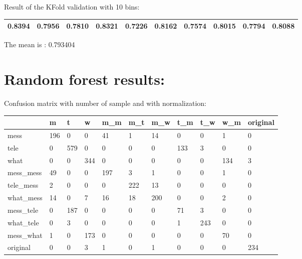 Result of the KFold validation with 10 bins:
 {\def\arraystretch{1.3} 
 \begin{table}[H] 
\centering 
\begin{tabular}{|l |l |l |l |l |l |l |l |l |l |}  
\hline 
0.8394&
0.7956&
0.7810&
0.8321&
0.7226&
0.8162&
0.7574&
0.8015&
0.7794&
0.8088\\ \hline  

\end{tabular} 
\end{table} }

The mean is : 0.793404\section{Random forest results:} 
Confusion matrix with number of sample and with normalization:
 {\def\arraystretch{1.3} 
 \begin{table}[H] 
\centering 
\begin{tabular}{|l|l|l|l|l|l|l|l|l|l|l|} 
\hline 
  &m  &t  &w  &m\_m  &m\_t  &m\_w  &t\_m  &t\_w  &w\_m  &original  \\ \hline
mess  &196  &0  &0  &41  &1  &14  &0  &0  &1  &0  \\ \hline
tele  &0  &579  &0  &0  &0  &0  &133  &3  &0  &0  \\ \hline
what  &0  &0  &344  &0  &0  &0  &0  &0  &134  &3  \\ \hline
mess\_mess  &49  &0  &0  &197  &3  &1  &0  &0  &1  &0  \\ \hline
tele\_mess  &2  &0  &0  &0  &222  &13  &0  &0  &0  &0  \\ \hline
what\_mess  &14  &0  &7  &16  &18  &200  &0  &0  &2  &0  \\ \hline
mess\_tele  &0  &187  &0  &0  &0  &0  &71  &3  &0  &0  \\ \hline
what\_tele  &0  &3  &0  &0  &0  &0  &1  &243  &0  &0  \\ \hline
mess\_what  &1  &0  &173  &0  &0  &0  &0  &0  &70  &0  \\ \hline
original  &0  &0  &3  &1  &0  &1  &0  &0  &0  &234  \\ \hline
\end{tabular} 
\end{table} }

